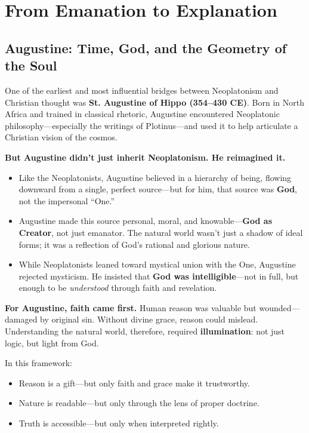 \section{From Emanation to Explanation}

\subsection{Augustine: Time, God, and the Geometry of the Soul}

One of the earliest and most influential bridges between Neoplatonism and Christian thought was \textbf{St. Augustine of Hippo (354–430 CE)}. Born in North Africa and trained in classical rhetoric, Augustine encountered Neoplatonic philosophy—especially the writings of Plotinus—and used it to help articulate a Christian vision of the cosmos.

\textbf{But Augustine didn’t just inherit Neoplatonism. He reimagined it.}

\begin{itemize}
  \item Like the Neoplatonists, Augustine believed in a hierarchy of being, flowing downward from a single, perfect source—but for him, that source was \textbf{God}, not the impersonal “One.”
  \item Augustine made this source personal, moral, and knowable—\textbf{God as Creator}, not just emanator. The natural world wasn’t just a shadow of ideal forms; it was a reflection of God’s rational and glorious nature.
  \item While Neoplatonists leaned toward mystical union with the One, Augustine rejected mysticism. He insisted that \textbf{God was intelligible}—not in full, but enough to be \emph{understood} through faith and revelation.
\end{itemize}

\textbf{For Augustine, faith came first.} Human reason was valuable but wounded—damaged by original sin. Without divine grace, reason could mislead. Understanding the natural world, therefore, required \textbf{illumination}: not just logic, but light from God.

\medskip

\noindent In this framework:
\begin{itemize}
  \item Reason is a gift—but only faith and grace make it trustworthy.
  \item Nature is readable—but only through the lens of proper doctrine.
  \item Truth is accessible—but only when interpreted rightly.
\end{itemize}

